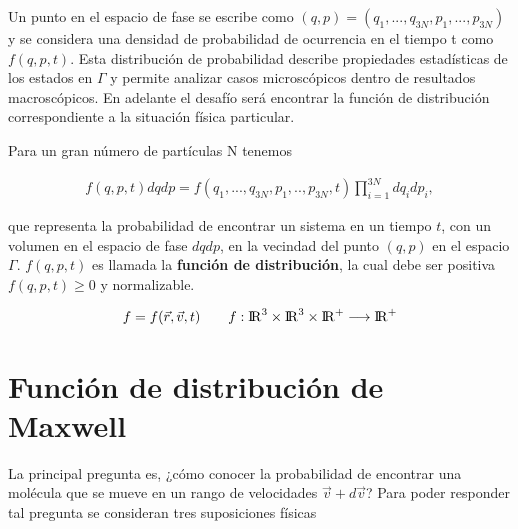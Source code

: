 \medskip

\noindent Un punto en el espacio de fase se escribe como $(q,p) = (q_{1}, ... ,q_{3N}, p_{1}, ... ,p_{3N})$ y se considera una densidad de probabilidad de ocurrencia en el tiempo t como $f(q,p,t)$. Esta distribución de probabilidad describe propiedades estadísticas de los estados en $\Gamma$ y permite analizar casos microscópicos dentro de resultados macroscópicos. En adelante el desafío será encontrar la función de distribución correspondiente a la situación física  particular.

\medskip

\noindent Para un gran número de partículas N tenemos \cite{Schwabl}

\begin{eqnarray}
f(q,p,t)dqdp = f(q_{1}, ... , q_{3N},p_{1},..,p_{3N},t)\prod_{i=1}^{3N}dq_{i}dp_{i},
\end{eqnarray}

\noindent que representa la probabilidad de encontrar un sistema en un tiempo $t$, con un volumen en el espacio de fase $dqdp$, en la vecindad del punto $(q,p)$ en el espacio $\Gamma$. $f(q,p,t)$ es llamada la \textbf{función de distribución}, la cual debe ser positiva $f(q,p,t) \geq 0$ y normalizable. 

\begin{eqnarray}
f = f(\vec{r},\vec{v},t) \qquad f:{\rm I\!R}^{3}\times{\rm I\!R}^{3}\times{\rm I\!R}^{+}\longrightarrow{\rm I\!R}^{+}
\end{eqnarray}



\section{Función de distribución de Maxwell}

\noindent La principal pregunta es, ¿cómo conocer la probabilidad de encontrar una molécula que se mueve en un rango de velocidades $\vec{v}+d\vec{v}$? Para poder responder tal pregunta se consideran tres suposiciones físicas \cite{lecture2}

